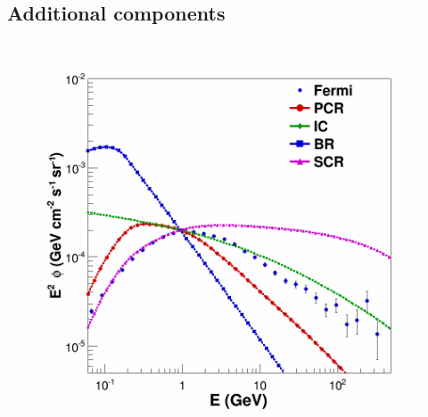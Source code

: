 \subsection{Additional components}

\begin{figure}[h]
  \centering
  \begin{minipage}[h]{0.45\textwidth}
  	\centering
	\includegraphics[width=1\linewidth]{pic/method/norm_bkg_comp.png}
  	\subcaption{}
 	\label{fig:norm_bkg_component}
  \end{minipage}
  \hfill
  \begin{minipage}[h]{0.45\textwidth}
	  \centering

\end{minipage}
\end{figure}

